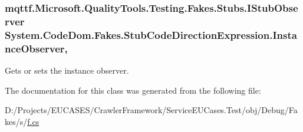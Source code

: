 \hypertarget{class_system_1_1_code_dom_1_1_fakes_1_1_stub_code_direction_expression_ab573b6450ffcf4f299a9088480478b2d}{
\subsubsection[{Instance\-Observer}]{\setlength{\rightskip}{0pt plus 5cm}mqttf.\-Microsoft.\-Quality\-Tools.\-Testing.\-Fakes.\-Stubs.\-I\-Stub\-Observer System.\-Code\-Dom.\-Fakes.\-Stub\-Code\-Direction\-Expression.\-Instance\-Observer\hspace{0.3cm}{\ttfamily [get]}, {\ttfamily [set]}}}\label{class_system_1_1_code_dom_1_1_fakes_1_1_stub_code_direction_expression_ab573b6450ffcf4f299a9088480478b2d}


Gets or sets the instance observer.



The documentation for this class was generated from the following file\-:\begin{DoxyCompactItemize}
\item 
D\-:/\-Projects/\-E\-U\-C\-A\-S\-E\-S/\-Crawler\-Framework/\-Service\-E\-U\-Cases.\-Test/obj/\-Debug/\-Fakes/s/\hyperlink{s_2f_8cs}{f.\-cs}\end{DoxyCompactItemize}
